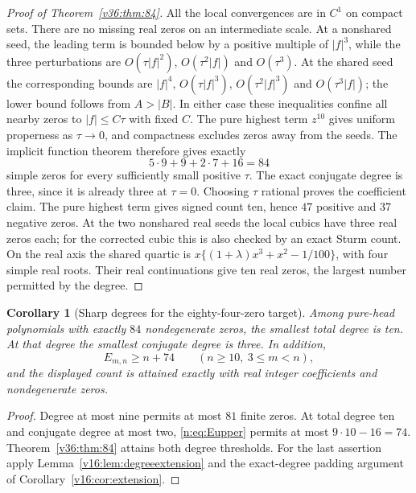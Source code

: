 \documentclass[UTF8,11pt]{ctexart}
\newtheorem{cor}[thm]{Corollary}
\theoremstyle{definition}
\numberwithin{equation}{section}
\begin{document}
\begin{proof}[Proof of Theorem~\ref{v36:thm:84}]
All the local convergences are in $C^1$ on compact sets.
There are no missing real zeros on an intermediate scale.
At a nonshared seed, the leading term is bounded below by
a positive multiple of $|f|^3$, while the three perturbations
are $O(\tau|f|^2)$, $O(\tau^2|f|)$ and $O(\tau^3)$.
At the shared seed the corresponding bounds are
$|f|^4$, $O(\tau|f|^3)$, $O(\tau^2|f|^3)$ and
$O(\tau^3|f|)$; the lower bound follows from $A>|B|$.
In either case these inequalities confine all nearby zeros to
$|f|\le C\tau$ with fixed $C$. The pure highest term $z^{10}$
gives uniform properness as $\tau\to0$, and compactness excludes
zeros away from the seeds. The implicit function theorem
therefore gives exactly
\[
                         5\cdot9+9+2\cdot7+16=84
\]
simple zeros for every sufficiently small positive $\tau$.
The exact conjugate degree is three, since it is already three
at $\tau=0$. Choosing $\tau$ rational proves the coefficient
claim. The pure highest term gives signed count ten, hence
$47$ positive and $37$ negative zeros.
At the two nonshared real seeds the local cubics have three real
zeros each; for the corrected cubic this is also checked by an
exact Sturm count. On the real axis the shared quartic is
$x\{(1+\lambda)x^3+x^2-1/100\}$, with four simple real roots.
Their real continuations give ten real zeros, the largest number
permitted by the degree.
\end{proof}

\begin{cor}[Sharp degrees for the eighty-four-zero target]
\label{v36:cor:degrees}
Among pure-head polynomials with exactly $84$ nondegenerate zeros,
the smallest total degree is ten. At that degree the smallest
conjugate degree is three. In addition,
\begin{equation}\label{v36:eq:extension}
                         E_{m,n}\ge n+74
             \qquad(n\ge10,\ 3\le m<n),
\end{equation}
and the displayed count is attained exactly with real integer
coefficients and nondegenerate zeros.
\end{cor}
\begin{proof}
Degree at most nine permits at most $81$ finite zeros. At total
degree ten and conjugate degree at most two,
\eqref{n:eq:Eupper} permits at most $9\cdot10-16=74$.
Theorem~\ref{v36:thm:84} attains both degree thresholds.
For the last assertion apply Lemma~\ref{v16:lem:degreeextension}
and the exact-degree padding argument of
Corollary~\ref{v16:cor:extension}.
\end{proof}
\end{document}
